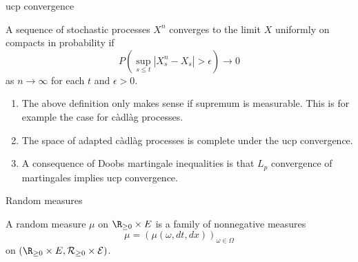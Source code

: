 \begin{frame}
    {ucp convergence}
    
    A sequence of stochastic processes $X^n$ converges to the limit $X$ uniformly 
    on compacts in probability if
    \begin{equation}
        P\left(  \sup_{s\leq t} |X_s^n - X_s| > \epsilon \right) \to 0
    \end{equation}
    as $n \to \infty$ for each $t$ and $\epsilon>0$.

    \begin{enumerate}
        \item The above definition only makes sense if supremum is measurable. This is for
            example the case for c\`adl\`ag processes.
        \item The space of adapted c\`adl\`ag processes is complete under the ucp convergence.
        \item A consequence of Doobs martingale inequalities is that $L_p$
            convergence of martingales implies ucp convergence.
    \end{enumerate}
\end{frame}









\begin{frame}
    {Random measures}
   
    A random measure $\mu$ on $\R_{\geq 0} \times E$ is a family of nonnegative measures 
    \begin{equation}
        \mu=\left( \mu\left( \omega, dt, dx \right) \right)_{\omega\in\Omega} 
    \end{equation}
    on $\left( \R_{\geq 0} \times E, \mathcal R_{\geq 0} \times \mathcal E \right)$.
\end{frame}



